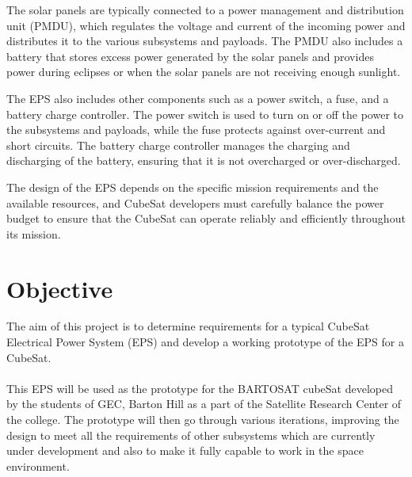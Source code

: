 
The solar panels are typically connected to a power management and distribution unit (PMDU), which regulates the voltage and current of the incoming power and distributes it to the various subsystems and payloads. The PMDU also includes a battery that stores excess power generated by the solar panels and provides power during eclipses or when the solar panels are not receiving enough sunlight.

The EPS also includes other components such as a power switch, a fuse, and a battery charge controller. The power switch is used to turn on or off the power to the subsystems and payloads, while the fuse protects against over-current and short circuits. The battery charge controller manages the charging and discharging of the battery, ensuring that it is not overcharged or over-discharged.

The design of the EPS depends on the specific mission requirements and the available resources, and CubeSat developers must carefully balance the power budget to ensure that the CubeSat can operate reliably and efficiently throughout its mission.

\section{Objective}
The aim of this project is to determine requirements for a typical CubeSat Electrical Power System (EPS) and develop a working prototype of the EPS for a CubeSat.
\\ \\
  This EPS will be used as the prototype for the BARTOSAT cubeSat developed by the students of GEC, Barton Hill as a part of the Satellite Research Center of the college. The prototype will then go through various iterations, improving the design to meet all the requirements of other subsystems which are currently under development and also to make it fully capable to work in the space environment.\\

